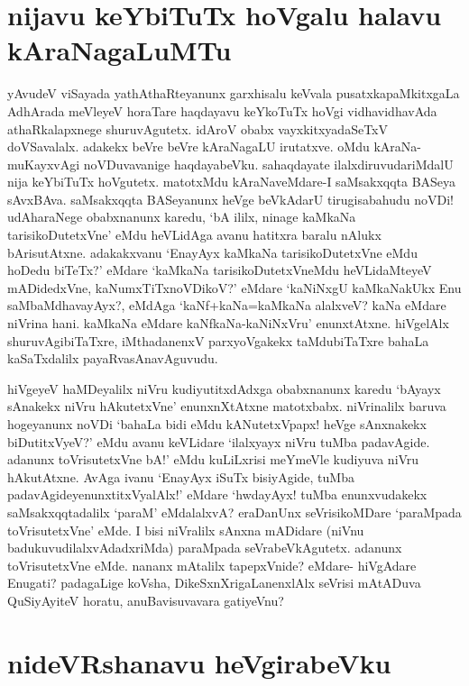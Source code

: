 \section*{nijavu keYbiTuTx hoVgalu halavu kAraNagaLuMTu}

yAvudeV viSayada yathAthaRteyanunx garxhisalu keVvala pusatxkapaMkitxgaLa AdhArada meVleyeV horaTare haqdayavu keYkoTuTx hoVgi vidhavidhavAda athaRkalapxnege shuruvAgutetx. idAroV obabx vayxkitxyadaSeTxV doVSavalalx. adakekx beVre beVre kAraNagaLU irutatxve. oMdu kAraNa-muKayxvAgi noVDuvavanige haqdayabeVku. sahaqdayate ilalxdiruvudariMdalU nija keYbiTuTx hoVgutetx. matotxMdu kAraNaveMdare-I saMsakxqqta BASeya sAvxBAva. saMsakxqqta BASeyanunx heVge beVkAdarU tirugisabahudu noVDi! udAharaNege obabxnanunx karedu, `bA ililx, ninage kaMkaNa tarisikoDutetxVne' eMdu heVLidAga avanu hatitxra baralu nAlukx bArisutAtxne. adakakxvanu `EnayAyx kaMkaNa tarisikoDutetxVne eMdu hoDedu biTeTx?' eMdare `kaMkaNa tarisikoDutetxVneMdu heVLidaMteyeV mADidedxVne, kaNumxTiTxnoVDikoV?' eMdare `kaNiNxgU kaMkaNakUkx Enu saMbaMdhavayAyx?, eMdAga `kaNf+kaNa=kaMkaNa alalxveV? kaNa eMdare niVrina hani. kaMkaNa eMdare kaNfkaNa-kaNiNxVru' enunxtAtxne. hiVgelAlx shuruvAgibiTaTxre, iMthadanenxV parxyoVgakekx taMdubiTaTxre bahaLa kaSaTxdalilx payaRvasAnavAguvudu.

hiVgeyeV haMDeyalilx niVru kudiyutitxdAdxga obabxnanunx karedu `bAyayx sAnakekx niVru hAkutetxVne' enunxnXtAtxne matotxbabx. niVrinalilx baruva hogeyanunx noVDi `bahaLa bidi eMdu kANutetxVpapx! heVge sAnxnakekx biDutitxVyeV?' eMdu avanu keVLidare `ilalxyayx niVru tuMba padavAgide. adanunx toVrisutetxVne bA!' eMdu kuLiLxrisi meYmeVle kudiyuva niVru hAkutAtxne. AvAga ivanu `EnayAyx iSuTx bisiyAgide, tuMba padavAgideyenunxtitxVyalAlx!' eMdare `hwdayAyx! tuMba enunxvudakekx saMsakxqqtadalilx `paraM' eMdalalxvA? eraDanUnx seVrisikoMDare `paraMpada toVrisutetxVne' eMde. I bisi niVralilx sAnxna mADidare (niVnu badukuvudilalxvAdadxriMda) paraMpada seVrabeVkAgutetx. adanunx toVrisutetxVne eMde. nananx mAtalilx tapepxVnide? eMdare- hiVgAdare Enugati? padagaLige koVsha, DikeSxnXrigaLanenxlAlx seVrisi mAtADuva QuSiyAyiteV horatu, anuBavisuvavara gatiyeVnu?

\section*{nideVRshanavu heVgirabeVku}

